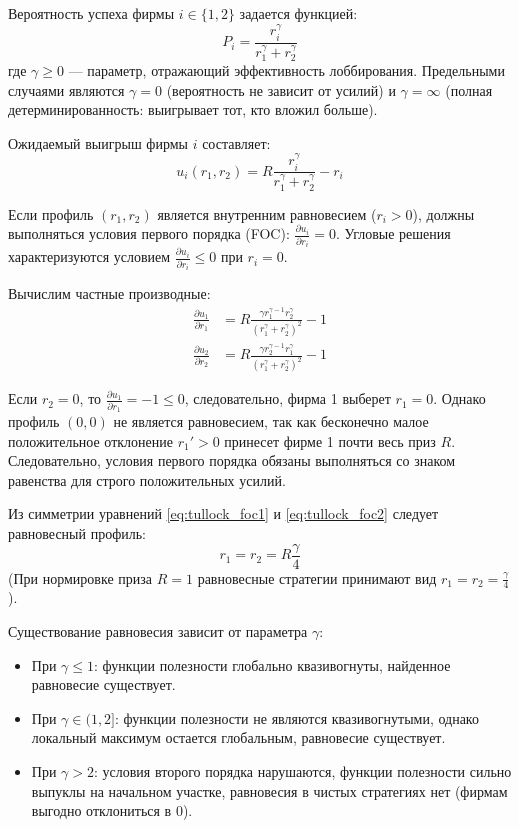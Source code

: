 Вероятность успеха фирмы $i \in \{1, 2\}$ задается функцией:
\[
P_i = \frac{r_i^\gamma}{r_1^\gamma + r_2^\gamma}
\]
где $\gamma \ge 0$ — параметр, отражающий эффективность лоббирования. Предельными случаями являются $\gamma = 0$ (вероятность не зависит от усилий) и $\gamma = \infty$ (полная детерминированность: выигрывает тот, кто вложил больше).

Ожидаемый выигрыш фирмы $i$ составляет:
\[
u_i(r_1, r_2) = R \frac{r_i^\gamma}{r_1^\gamma + r_2^\gamma} - r_i
\]

Если профиль $(r_1, r_2)$ является внутренним равновесием ($r_i > 0$), должны выполняться условия первого порядка (FOC): $\frac{\partial u_i}{\partial r_i} = 0$. Угловые решения характеризуются условием $\frac{\partial u_i}{\partial r_i} \le 0$ при $r_i = 0$.

Вычислим частные производные:
\begin{align}
\frac{\partial u_1}{\partial r_1} &= R \frac{\gamma r_1^{\gamma-1} r_2^\gamma}{(r_1^\gamma + r_2^\gamma)^2} - 1 \label{eq:tullock_foc1} \\
\frac{\partial u_2}{\partial r_2} &= R \frac{\gamma r_2^{\gamma-1} r_1^\gamma}{(r_1^\gamma + r_2^\gamma)^2} - 1 \label{eq:tullock_foc2}
\end{align}

Если $r_2 = 0$, то $\frac{\partial u_1}{\partial r_1} = -1 \le 0$, следовательно, фирма 1 выберет $r_1 = 0$. Однако профиль $(0, 0)$ не является равновесием, так как бесконечно малое положительное отклонение $r_1' > 0$ принесет фирме 1 почти весь приз $R$. Следовательно, условия первого порядка обязаны выполняться со знаком равенства для строго положительных усилий.

Из симметрии уравнений \eqref{eq:tullock_foc1} и \eqref{eq:tullock_foc2} следует равновесный профиль:
\[
r_1 = r_2 = R \frac{\gamma}{4}
\]
(При нормировке приза $R = 1$ равновесные стратегии принимают вид $r_1 = r_2 = \frac{\gamma}{4}$). 

Существование равновесия зависит от параметра $\gamma$:
\begin{itemize}
    \item При $\gamma \le 1$: функции полезности глобально квазивогнуты, найденное равновесие существует.
    \item При $\gamma \in (1, 2]$: функции полезности не являются квазивогнутыми, однако локальный максимум остается глобальным, равновесие существует.
    \item При $\gamma > 2$: условия второго порядка нарушаются, функции полезности сильно выпуклы на начальном участке, равновесия в чистых стратегиях нет (фирмам выгодно отклониться в 0).
\end{itemize}


